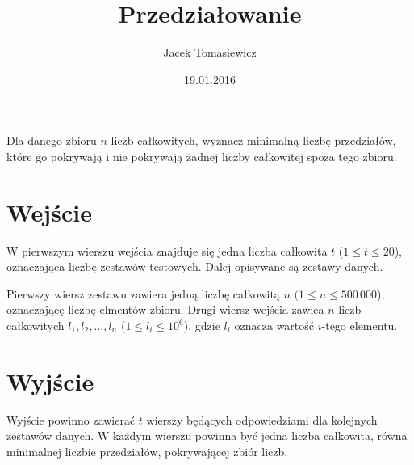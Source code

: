 \documentclass[zad,zawodnik,utf8]{sinol}
\title{Przedziałowanie}
\author{Jacek Tomasiewicz} %
\date{19.01.2016}
\begin{document}
  \begin{tasktext}%
Dla danego zbioru $n$ liczb całkowitych, wyznacz minimalną liczbę przedziałów, które go pokrywają i nie pokrywają żadnej liczby całkowitej spoza tego zbioru.

  \section{Wejście}
W pierwszym wierszu wejścia znajduje się jedna liczba całkowita $t$ ($1 \leq t \leq 20$), oznaczająca liczbę zestawów testowych. Dalej opisywane są zestawy danych.

Pierwszy wiersz zestawu zawiera jedną liczbę całkowitą $n$ $(1\leq n \leq 500\,000$), oznaczającę liczbę elmentów zbioru.
Drugi wiersz wejścia zawiea $n$ liczb całkowitych $l_1, l_2, \ldots, l_n$ ($1 \leq l_i \leq 10^6$), gdzie $l_i$ oznacza wartość $i$-tego elementu.

  \section{Wyjście}
Wyjście powinno zawierać $t$ wierszy będących odpowiedziami dla kolejnych zestawów danych. W każdym wierszu powinna być jedna liczba całkowita, równa minimalnej liczbie przedziałów, pokrywającej zbiór liczb.


     \makecompactexample


  \end{tasktext}
\end{document}
